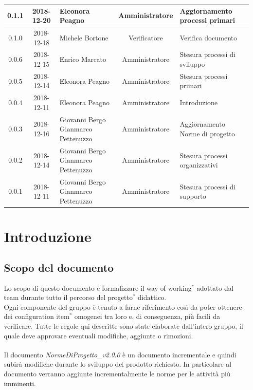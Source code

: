 \documentclass[11pt,a4paper]{article}
\begin{document}
{\begin{tabularx}{\textwidth}{ c | c | p{3.80cm} | c | X }
		0.1.1 & 2018-12-20 & Eleonora Peagno & Amministratore & Aggiornamento processi primari \\ \hline
		0.1.0 & 2018-12-18 & Michele Bortone & Verificatore & Verifica documento \\ \hline
		0.0.6 & 2018-12-15 & Enrico Marcato & Amministratore & Stesura processi di \newline sviluppo \\ \hline
		0.0.5 & 2018-12-14 & Eleonora Peagno & Amministratore & Stesura processi primari \\ \hline
		0.0.4 & 2018-12-11 & Eleonora Peagno & Amministratore & Introduzione \\ \hline
		0.0.3 & 2018-12-16 & Giovanni Bergo \newline Gianmarco Pettenuzzo & Amministratore & Aggiornamento Norme di progetto \\ \hline
		0.0.2 & 2018-12-14 & Giovanni Bergo \newline Gianmarco Pettenuzzo & Amministratore & Stesura processi \newline organizzativi \\ \hline
		0.0.1 & 2018-12-11 & Giovanni Bergo \newline Gianmarco Pettenuzzo & Amministratore & Stesura processi di \newline supporto \\ \hline		
	\end{tabularx}
	
	\newpage	
	
	\renewcommand  \contentsname {\Large Indice} 
	
	\tableofcontents
	\newpage
	\listoffigures
	\lstlistoflistings
	\newpage
	
	\section{Introduzione}
	\subsection{Scopo del documento}
	Lo scopo di questo documento è formalizzare il way of working$^*$ adottato dal team durante tutto il percorso del progetto$^*$ didattico. 
	\\Ogni componente del gruppo è tenuto a farne riferimento così da poter ottenere dei configuration item$^*$ omogenei tra loro e, di conseguenza, più facili da verificare. 
	Tutte le regole qui descritte sono state elaborate dall'intero gruppo, il quale deve approvare eventuali modifiche, aggiunte o rimozioni.
	\\\\
	Il documento \textit{NormeDiProgetto\_v2.0.0} è un documento incrementale e quindi subirà modifiche durante lo sviluppo del prodotto richiesto. In particolare al documento verranno aggiunte incrementalmente le norme per le attività più imminenti.
}
\end{document}
